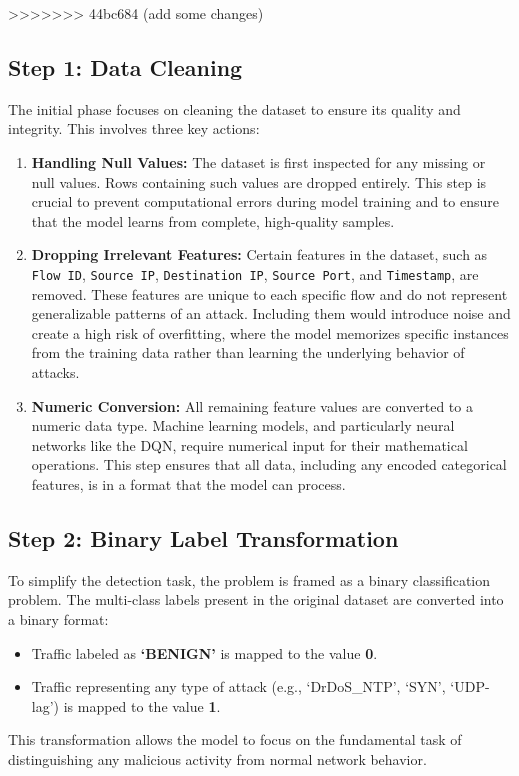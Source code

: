 \documentclass{report}
\begin{document}
>>>>>>> 44bc684 (add some changes)

\subsection{Step 1: Data Cleaning}
The initial phase focuses on cleaning the dataset to ensure its quality and integrity. This involves three key actions:
\begin{enumerate}
    \item \textbf{Handling Null Values:} The dataset is first inspected for any missing or null values. Rows containing such values are dropped entirely. This step is crucial to prevent computational errors during model training and to ensure that the model learns from complete, high-quality samples.

    \item \textbf{Dropping Irrelevant Features:} Certain features in the dataset, such as \texttt{Flow ID}, \texttt{Source IP}, \texttt{Destination IP}, \texttt{Source Port}, and \texttt{Timestamp}, are removed. These features are unique to each specific flow and do not represent generalizable patterns of an attack. Including them would introduce noise and create a high risk of overfitting, where the model memorizes specific instances from the training data rather than learning the underlying behavior of attacks.

    \item \textbf{Numeric Conversion:} All remaining feature values are converted to a numeric data type. Machine learning models, and particularly neural networks like the DQN, require numerical input for their mathematical operations. This step ensures that all data, including any encoded categorical features, is in a format that the model can process.
\end{enumerate}

\subsection{Step 2: Binary Label Transformation}
To simplify the detection task, the problem is framed as a binary classification problem. The multi-class labels present in the original dataset are converted into a binary format:
\begin{itemize}
    \item Traffic labeled as \textbf{`BENIGN'} is mapped to the value \textbf{0}.
    \item Traffic representing any type of attack (e.g., `DrDoS\_NTP', `SYN', `UDP-lag') is mapped to the value \textbf{1}.
\end{itemize}
This transformation allows the model to focus on the fundamental task of distinguishing any malicious activity from normal network behavior.
\end{document}
